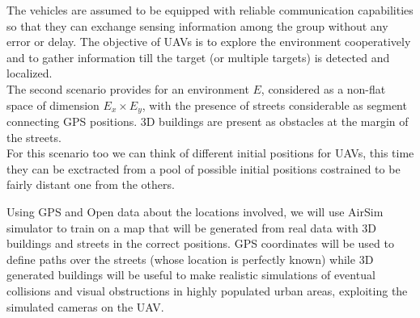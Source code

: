 \documentclass[LaM,binding=0.6cm]{sapthesis}
\begin{document}
The vehicles are assumed to be equipped with reliable
communication capabilities so that they can exchange sensing information among the group without any error or delay.
The objective of UAVs is to explore the environment cooperatively and to gather information till the target (or multiple targets) is detected and localized.\\
The second scenario provides for an environment $E$, considered as a non-flat space of dimension $E_x \times E_y$, with the presence of streets considerable as segment connecting GPS positions. 3D buildings are present as obstacles at the margin of the streets.\\
For this scenario too we can think of different initial positions for UAVs, this time they can be exctracted from a pool of possible initial positions costrained to be fairly distant one from the others.

Using GPS and Open data about the locations involved, we will use AirSim simulator to train on a map that will be generated from real data with 3D buildings and streets in the correct positions. GPS coordinates will be used to define paths over the streets (whose location is perfectly known) while 3D generated buildings will be useful to make realistic simulations of eventual collisions and visual obstructions in highly populated urban areas, exploiting the simulated cameras on the UAV.
\end{document}
